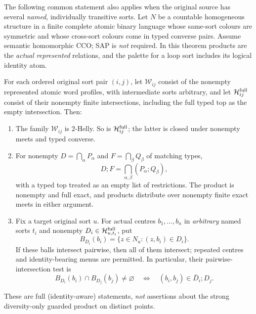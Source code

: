 \begin{theorem}
\label{thm:full-typed-exact-balls}
The following common statement also applies when the original source
has several \emph{named}, individually transitive sorts. Let $N$ be a
countable homogeneous structure in a finite complete atomic binary
language whose same-sort
colours are symmetric and whose cross-sort colours come in typed
converse pairs. Assume semantic homomorphic CCO; SAP is \emph{not}
required. In this theorem products are the \emph{actual represented}
relations, and the palette for a loop sort includes its logical
identity atom.

For each ordered original sort pair $(i,j)$, let
$\mathcal W_{ij}$ consist of the nonempty represented atomic word
profiles, with intermediate sorts arbitrary, and let
$\mathcal H^{\rm full}_{ij}$ consist of their nonempty finite
intersections, including the full typed top as the empty intersection.
Then:
\begin{enumerate}[label=(\roman*),leftmargin=*]
\item The family $\mathcal W_{ij}$ is $2$-Helly. So is
$\mathcal H^{\rm full}_{ij}$; the latter is closed under
nonempty meets and typed converse.
\item For nonempty $D=\bigcap_\alpha P_\alpha$ and
$F=\bigcap_\beta Q_\beta$ of matching types,
\[
  D;F=\bigcap_{\alpha,\beta}(P_\alpha;Q_\beta),
\]
with a typed top treated as an empty list of restrictions. The
product is nonempty and full exact, and products distribute over
nonempty finite exact meets in either argument.
\item Fix a target original sort $u$. For actual centres
$b_1,\ldots,b_n$ in \emph{arbitrary} named sorts $t_i$ and
nonempty $D_i\in\mathcal H^{\rm full}_{u,t_i}$, put
\[
  B_{D_i}(b_i)=\{z\in N_u:(z,b_i)\in D_i\}.
\]
If these balls intersect pairwise, then all of them intersect;
repeated centres and identity-bearing menus are permitted. In
particular, their pairwise-intersection test is
\[
 B_{D_i}(b_i)\cap B_{D_j}(b_j)\ne\varnothing
 \quad\Longleftrightarrow\quad
 (b_i,b_j)\in\bar D_i;D_j.
\]
\end{enumerate}
These are full (identity-aware) statements, \emph{not} assertions
about the strong diversity-only guarded product on distinct points.
\end{theorem}
